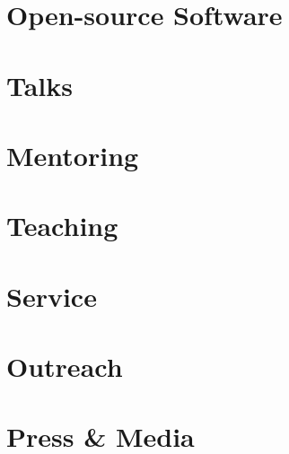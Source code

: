 \documentclass[a4paper,12pt]{article}
\begin{document}
\section{Open-source Software}


\section{Talks}


\section{Mentoring}


\section{Teaching}


\section{Service}


\section{Outreach}


\section{Press \& Media}


% 

\vfill
{}
\end{document}
